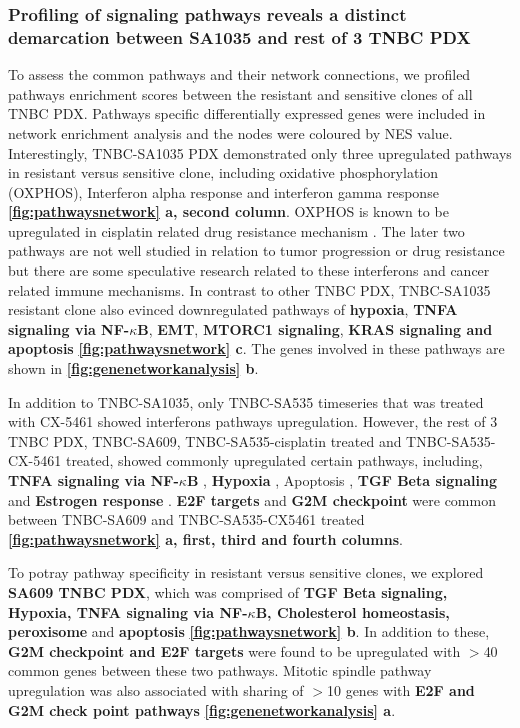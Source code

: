 \subsubsection{Profiling of signaling pathways reveals a distinct demarcation between SA1035 and rest of 3 TNBC PDX}
To assess the common pathways and their network connections, 
we profiled pathways enrichment scores between the resistant and sensitive clones of all TNBC PDX. 
Pathways specific differentially expressed genes were included in network enrichment analysis and the nodes were coloured by NES value. Interestingly, TNBC-SA1035 PDX demonstrated only three upregulated pathways in resistant versus sensitive clone, including oxidative phosphorylation (OXPHOS), Interferon alpha response \cite{provance2019deciphering} and interferon gamma response \cite{mojic2018dark} \textbf{\autoref{fig:pathwaysnetwork} a, second column}. \ac{OXPHOS} is known to be upregulated in cisplatin related drug resistance mechanism \cite{lee2017myc}. The later two pathways are not well studied in relation to tumor progression or drug resistance but there are some speculative research related to these interferons and cancer related immune mechanisms. In contrast to other TNBC PDX, TNBC-SA1035 resistant clone also evinced downregulated pathways of \textbf{hypoxia}, \textbf{TNFA signaling via NF-$\kappa$B}, \textbf{\ac{EMT}}, \textbf{MTORC1 signaling}, \textbf{KRAS signaling and apoptosis} {\textbf{\autoref{fig:pathwaysnetwork} c}}. The genes involved in these pathways are shown in \textbf{\autoref{fig:genenetworkanalysis} b}.

In addition to TNBC-SA1035, only TNBC-SA535 timeseries that was treated with CX-5461 showed interferons pathways upregulation. However, the rest of 3 TNBC PDX, TNBC-SA609, TNBC-SA535-cisplatin treated and TNBC-SA535-CX-5461 treated, showed commonly upregulated certain pathways, including, \textbf{TNFA signaling via NF-$\kappa$B} \cite{lagunas2008nuclear,ito2015down, ryan2019targeting}, \textbf{Hypoxia} \cite{lee2012hypoxia, mcevoy2015identifying, deben2018hypoxia,li2019erk}, Apoptosis \cite{panaretakis2012cisplatin}, \textbf{TGF Beta signaling} \cite{zhang2019tgfbeta1} and \textbf{Estrogen response} \cite{zhu2018er}. \textbf{E2F targets} \cite{zheng2020upregulation} and \textbf{G2M checkpoint} \cite{visconti2016cell} were common between TNBC-SA609 and TNBC-SA535-CX5461 treated \textbf{\autoref{fig:pathwaysnetwork} a, first, third and fourth columns}. 

To potray pathway specificity in resistant versus sensitive clones, we explored \textbf{SA609 TNBC PDX}, which was  comprised of \textbf{TGF Beta signaling, Hypoxia, TNFA signaling via NF-$\kappa$B, Cholesterol homeostasis, peroxisome} and \textbf{apoptosis} \textbf{\autoref{fig:pathwaysnetwork} b}. In addition to these, \textbf{G2M checkpoint and E2F targets} were found to be upregulated with $>$40 common genes between these two pathways. Mitotic spindle pathway upregulation was also associated with sharing of $>$10 genes with \textbf{E2F and G2M check point pathways} \textbf{\autoref{fig:genenetworkanalysis} a}.


